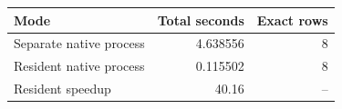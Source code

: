 {\small
\begin{tabular}{lrr}
\hline
Mode & Total seconds & Exact rows \\
\hline
Separate native process & 4.638556 & 8 \\
Resident native process & 0.115502 & 8 \\
Resident speedup & 40.16 & -- \\
\hline
\end{tabular}
}
